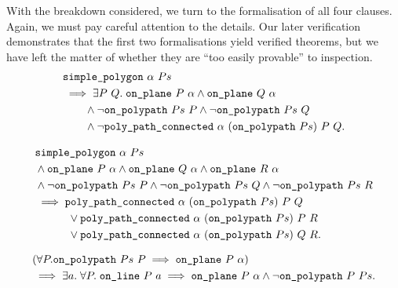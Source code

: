 With the breakdown considered, we turn to the formalisation of all four clauses. Again, we must pay careful attention to the details. Our later verification demonstrates that the first two formalisations yield verified theorems, but we have left the matter of whether they are ``too easily provable'' to inspection.
\begin{equation}\label{eq:jordanFormal1}
  \begin{split}
    &\code{simple\_polygon}\ \alpha\ Ps\\
    &\implies \exists P\ Q.\; \code{on\_plane}\ P\ \alpha \wedge \code{on\_plane}\ Q\ \alpha\\
    &\qquad\wedge \neg\code{on\_polypath}\ Ps\ P \wedge \neg\code{on\_polypath}\ Ps\ Q\\
    &\qquad\wedge \neg\code{poly\_path\_connected}\ \alpha\ (\code{on\_polypath}\ Ps)\ P\ Q.
  \end{split}
\end{equation}

\begin{equation}\label{eq:jordanFormal2}
  \begin{split}
  &\code{simple\_polygon}\ \alpha\ Ps\\
  &\wedge \code{on\_plane}\ P\ \alpha \wedge \code{on\_plane}\ Q\ \alpha \wedge \code{on\_plane}\ R\ \alpha\\
  &\wedge \neg\code{on\_polypath}\ Ps\ P\wedge \neg\code{on\_polypath}\ Ps\ Q\wedge \neg\code{on\_polypath}\ Ps\ R\\
  &\implies \code{poly\_path\_connected}\ \alpha\ (\code{on\_polypath}\ Ps)\ P\ Q\\
  &\qquad\quad\vee \code{poly\_path\_connected}\ \alpha\ (\code{on\_polypath}\ Ps)\ P\ R\\
  &\qquad\quad\vee \code{poly\_path\_connected}\ \alpha\ (\code{on\_polypath}\ Ps)\ Q\ R.
     \end{split}
\end{equation}

\begin{equation}\label{eq:jordanFormal3}
  \begin{split}
  &(\forall P. \code{on\_polypath}\ Ps\ P \implies \code{on\_plane}\ P\ \alpha)\\
  &\implies \exists a.\; \forall P.\; \code{on\_line}\ P\ a \implies \code{on\_plane}\ P\ \alpha
  \wedge \neg\code{on\_polypath}\ P\ Ps.
     \end{split}
\end{equation}

